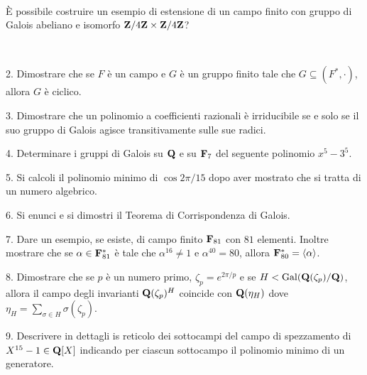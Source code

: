 \ \dotfill\ \bigskip\bigskip\bigskip\vfil

 \`E possibile costruire un esempio di estensione di un campo finito con gruppo di Galois abeliano e isomorfo ${\bf Z}/4{\bf Z}\times{\bf Z}/4{\bf Z}$?\medskip\bigskip\bigskip

\ \dotfill\ \bigskip\bigskip\bigskip

\vfil\eject

\item{2.} Dimostrare che se $F$ \`e un campo e $G$ \`e un gruppo finito tale che $G\subseteq (F^*,\cdot)$, allora $G$ \`e ciclico.

\vv


\item{3.} Dimostrare che un polinomio a coefficienti razionali \`e irriducibile se e solo 
se il suo gruppo di Galois agisce transitivamente sulle sue radici.
\vv

\item{4.} Determinare i gruppi di Galois su ${\bf Q}$  e su ${\bf F}_7$ del seguente polinomio $x^5-3^5$.\ve\ \vs

\item{5.} Si calcoli il polinomio minimo di $\cos2\pi/15$ dopo aver mostrato che si tratta di un numero algebrico.
\vv


\item{6.} Si enunci e si dimostri il Teorema di Corrispondenza di Galois.\vv


\item{7.}  Dare un esempio, se esiste, di campo finito ${\bf F}_{81}$ con $81$
elementi. Inoltre mostrare che se $\alpha\in{\bf F}_{81}^*$ \`e tale che $\alpha^{16}\neq1$ e 
$\alpha^{40}=80$, allora ${\bf F}_{80}^*=\langle\alpha\rangle$.\ve\ \vs

\item{8.} Dimostrare che se $p$ \`e un numero primo, $\zeta_p=e^{2\pi/p}$ e se $H<{\rm Gal}({\bf Q}(\zeta_p)/{\bf Q})$, allora il campo degli invarianti ${\bf Q}(\zeta_p)^H$ coincide con ${\bf Q}(\eta_H)$ dove $\eta_H=\sum_{\sigma\in H}\sigma(\zeta_p)$.\vv

\item{9.} Descrivere in dettagli is reticolo dei sottocampi del campo di spezzamento di $X^{15}-1\in{\bf Q}[X]$ indicando per ciascun sottocampo il polinomio minimo di un generatore.
\ \vst

 \bye
